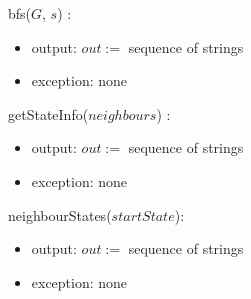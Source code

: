 \documentclass[12pt]{article}
\begin{document}
\noindent bfs($G$, $s$) :
\begin{itemize}
\item output: $out := $ sequence of strings
\item exception: none
\end{itemize}

\noindent getStateInfo($neighbours$) :
\begin{itemize}
\item output: $out := $ sequence of strings
\item exception: none
\end{itemize}

\noindent neighbourStates($startState$):
\begin{itemize}
\item output: $out := $ sequence of strings
\item exception: none
\end{itemize}
\end{document}
